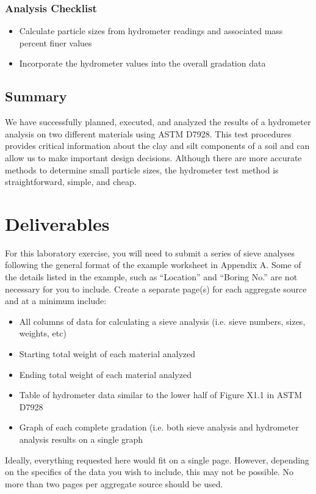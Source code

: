 \documentclass[12pt]{article}
\begin{document}
\subsubsection*{Analysis Checklist}
\begin{itemize}
    \item Calculate particle sizes from hydrometer readings and associated mass percent finer values
    \item Incorporate the hydrometer values into the overall gradation data
\end{itemize}

\subsection{Summary}
We have successfully planned, executed, and analyzed the results of a hydrometer analysis on two different materials using ASTM D7928. This test procedures provides critical information about the clay and silt components of a soil and can allow us to make important design decisions. Although there are more accurate methods to determine small particle sizes, the hydrometer test method is straightforward, simple, and cheap.

\pagebreak
\section{Deliverables}
For this laboratory exercise, you will need to submit a series of sieve analyses following the general format of the example worksheet in Appendix A. Some of the details listed in the example, such as ``Location'' and ``Boring No.'' are not necessary for you to include. Create a separate page(s) for each aggregate source and at a minimum include:
\begin{itemize}
    \item All columns of data for calculating a sieve analysis (i.e. sieve numbers, sizes, weights, etc)
    \item Starting total weight of each material analyzed
    \item Ending total weight of each material analyzed
    \item Table of hydrometer data similar to the lower half of Figure X1.1 in ASTM D7928
    \item Graph of each complete gradation (i.e. both sieve analysis and hydrometer analysis results on a single graph
\end{itemize}

Ideally, everything requested here would fit on a single page. However, depending on the specifics of the data you wish to include, this may not be possible. No more than two pages per aggregate source should be used.
\end{document}
